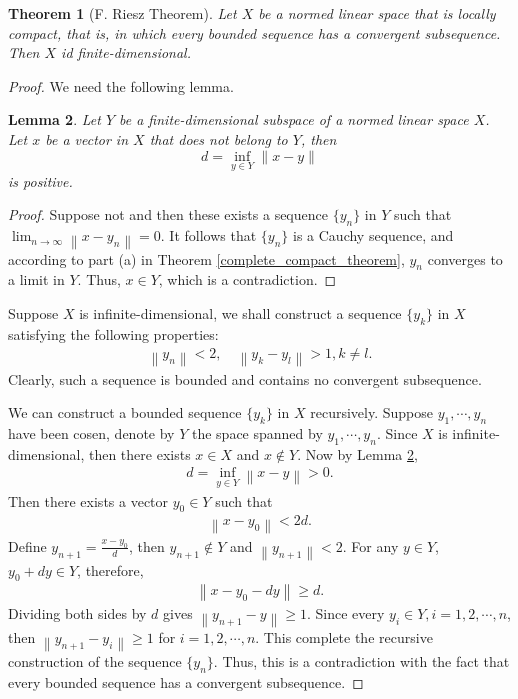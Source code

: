 \documentclass[10pt]{book}
\newtheorem{theorem}{Theorem}[chapter]
\newtheorem{lemma}[theorem]{Lemma}
\theoremstyle{definition}
\numberwithin{equation}{chapter}
\begin{document}
\begin{theorem}[F. Riesz Theorem]\label{riesz_theorem_finite_dim}
Let $X$ be a normed linear space that is locally compact, that is, in which every bounded sequence has a convergent subsequence. Then $X$ id finite-dimensional.
\end{theorem}
\begin{proof}
We need the following lemma.

\begin{lemma}\label{finite_dimensional_distance_lemma}
Let $Y$ be a finite-dimensional subspace of a normed linear space $X$. Let $x$ be a vector in $X$ that does not belong to $Y$, then 
$$d = \inf_{y\in Y} \|x - y\| $$
is positive. 
\end{lemma}
\begin{proof}
Suppose not and then these exists a sequence $\{y_n\}$ in $Y$ such that $\lim_{n\to\infty} \left\|x - y_n\right\| = 0$. It follows that $\{y_n\}$ is a Cauchy sequence, and according to part (a) in Theorem \ref{complete_compact_theorem}, $y_n$ converges to a limit in $Y$. Thus, $x \in Y$, which is a contradiction.
\end{proof}

Suppose $X$ is infinite-dimensional, we shall construct a sequence $\{y_k\}$ in $X$ satisfying the following properties:
\begin{align*}
    \left\|y_n\right\| < 2, \quad \left\|y_k - y_l\right\| > 1, k \neq l.
\end{align*}
Clearly, such a sequence is bounded and contains no convergent subsequence.

We can construct a bounded sequence $\{y_k\}$ in $X$ recursively. Suppose $y_1, \cdots, y_n$ have been cosen, denote by $Y$ the space spanned by $y_1, \cdots, y_n$. Since $X$ is infinite-dimensional, then there exists $x \in X$ and $x \notin Y$. Now by Lemma \ref{finite_dimensional_distance_lemma}, 
\begin{align*}
    d = \inf_{y \in Y} \left\|x - y\right\| > 0.
\end{align*}
Then there exists a vector $y_0 \in Y$ such that
\begin{align*}
    \left\|x - y_0\right\| < 2d.
\end{align*}
Define $y_{n+1} = \frac{x - y_0}{d}$, then $y_{n+1} \notin Y$ and $\left\|y_{n+1}\right\| < 2$. For any $y \in Y$, $y_0 + dy \in Y$, therefore, 
\begin{align*}
    \left\|x - y_0 - dy\right\| \geq d.
\end{align*}
Dividing both sides by $d$ gives $\left\|y_{n+1} - y\right\| \geq 1$. Since every $y_i \in Y, i = 1, 2, \cdots, n$, then $\left\|y_{n+1} - y_i\right\| \geq 1$ for $i = 1, 2, \cdots, n$. This complete the recursive construction of the sequence $\{y_n\}$. Thus, this is a contradiction with the fact that every bounded sequence has a convergent subsequence.
\end{proof}
\end{document}
